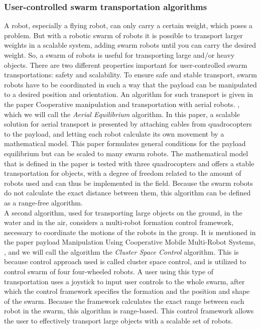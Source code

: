 \subsubsection{User-controlled swarm transportation algorithms}
A robot, especially a flying robot, can only carry a certain weight, which poses a problem. 
But with a robotic swarm of robots it is possible to transport larger weights in a scalable system, adding swarm robots until you can carry the desired weight. 
So, a swarm of robots is useful for transporting large and/or heavy objects. 
There are two different properties important for user-controlled swarm transportations: safety and scalability. 
To ensure safe and stable transport, swarm robots have to be coordinated in such a way that the payload can be manipulated to a desired position and orientation.
An algorithm for such transport is given in the paper Cooperative manipulation and transportation with aerial robots. \cite{Michael2011}, which we will call the \emph{Aerial Equilibrium} algorithm. 
In this paper, a scalable solution for aerial transport is presented by attaching cables from quadrocopters to the payload, and letting each robot calculate its own movement by a mathematical model. 
This paper formulates general conditions for the payload equilibrium but can be scaled to many swarm robots. 
The mathematical model that is defined in the paper is tested with three quadrocopters and offers a stable transportation for objects, with a degree of freedom related to the amount of robots used and can thus be implemented in the field.
Because the swarm robots do not calculate the exact distance between them, this algorithm can be defined as a range-free algorithm. \\

A second algorithm, used for transporting large objects on the ground, in the water and in the air, considers a multi-robot formation control framework, necessary to coordinate the motions of the robots in the group. 
It is mentioned in the paper payload Manipulation Using Cooperative Mobile Multi-Robot Systems, \cite{Mas2012}, and we will call the algorithm the \emph{Cluster Space Control} algorithm.
This is because control approach used is called cluster space control, and is utilized to control swarm of four four-wheeled robots. 
A user using this type of transportation uses a joystick to input user controls to the whole swarm, after which the control framework specifies the formation and the position and shape of the swarm.
Because the framework calculates the exact range between each robot in the swarm, this algorithm is range-based. 
This control framework allows the user to effectively transport large objects with a scalable set of robots. \\

